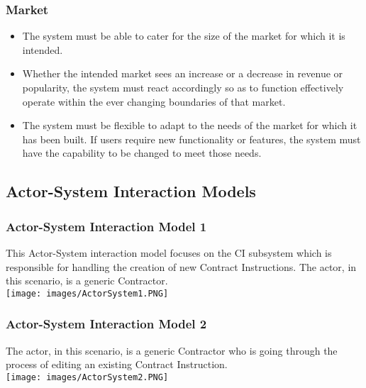 \documentclass[11pt]{article}
\begin{document}
    \subsubsection{Market}
    \begin{itemize}
        \item The system must be able to cater for the size of the market for which it is intended.
        \item Whether the intended market sees an increase or a decrease in revenue or popularity, the system must react accordingly so as to function effectively operate within the ever changing boundaries of that market.
        \item The system must be flexible to adapt to the needs of the market for which it has been built. If users require new functionality or features, the system must have the capability to be changed to meet those needs.
    \end{itemize}
\subsection{Actor-System Interaction Models}
\subsubsection{Actor-System Interaction Model 1}
This Actor-System interaction model focuses on the CI subsystem which is responsible for handling the creation of new Contract Instructions. The actor, in this scenario, is a generic Contractor.\\[0.5cm]
\texttt{[image: images/ActorSystem1.PNG]}
\newline
\subsubsection{Actor-System Interaction Model 2}
The actor, in this scenario, is a generic Contractor who is going through the process of editing an existing Contract Instruction.\\[0.5cm]
\texttt{[image: images/ActorSystem2.PNG]}
\end{document}
